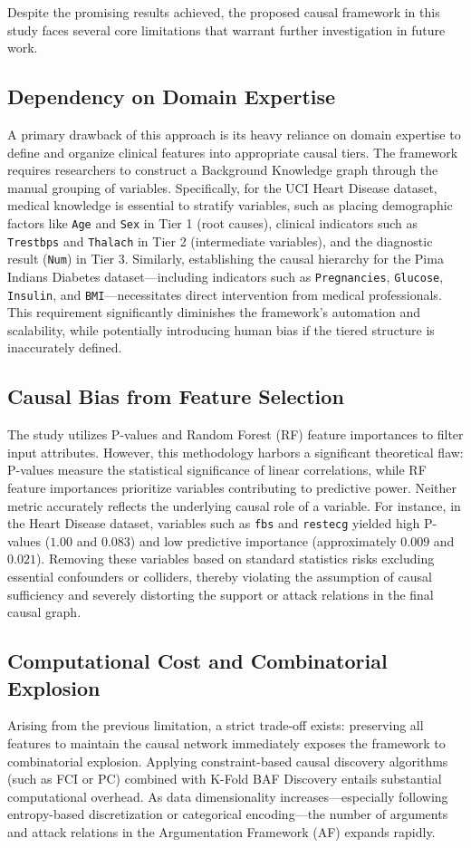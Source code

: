 \documentclass[conference, a4paper]{IEEEtran}
\begin{document}
Despite the promising results achieved, the proposed causal framework in this study faces several core limitations that warrant further investigation in future work.

\subsection{Dependency on Domain Expertise}
A primary drawback of this approach is its heavy reliance on domain expertise to define and organize clinical features into appropriate causal tiers. The framework requires researchers to construct a Background Knowledge graph through the manual grouping of variables. Specifically, for the UCI Heart Disease dataset, medical knowledge is essential to stratify variables, such as placing demographic factors like \texttt{Age} and \texttt{Sex} in Tier 1 (root causes), clinical indicators such as \texttt{Trestbps} and \texttt{Thalach} in Tier 2 (intermediate variables), and the diagnostic result (\texttt{Num}) in Tier 3. Similarly, establishing the causal hierarchy for the Pima Indians Diabetes dataset—including indicators such as \texttt{Pregnancies}, \texttt{Glucose}, \texttt{Insulin}, and \texttt{BMI}—necessitates direct intervention from medical professionals. This requirement significantly diminishes the framework's automation and scalability, while potentially introducing human bias if the tiered structure is inaccurately defined.

\subsection{Causal Bias from Feature Selection}
The study utilizes P-values and Random Forest (RF) feature importances to filter input attributes. However, this methodology harbors a significant theoretical flaw: P-values measure the statistical significance of linear correlations, while RF feature importances prioritize variables contributing to predictive power. Neither metric accurately reflects the underlying causal role of a variable. For instance, in the Heart Disease dataset, variables such as \texttt{fbs} and \texttt{restecg} yielded high P-values ($1.00$ and $0.083$) and low predictive importance (approximately $0.009$ and $0.021$). Removing these variables based on standard statistics risks excluding essential confounders or colliders, thereby violating the assumption of causal sufficiency and severely distorting the support or attack relations in the final causal graph.

\subsection{Computational Cost and Combinatorial Explosion}
Arising from the previous limitation, a strict trade-off exists: preserving all features to maintain the causal network immediately exposes the framework to combinatorial explosion. Applying constraint-based causal discovery algorithms (such as FCI or PC) combined with K-Fold BAF Discovery entails substantial computational overhead. As data dimensionality increases—especially following entropy-based discretization or categorical encoding—the number of arguments and attack relations in the Argumentation Framework (AF) expands rapidly.
\end{document}
